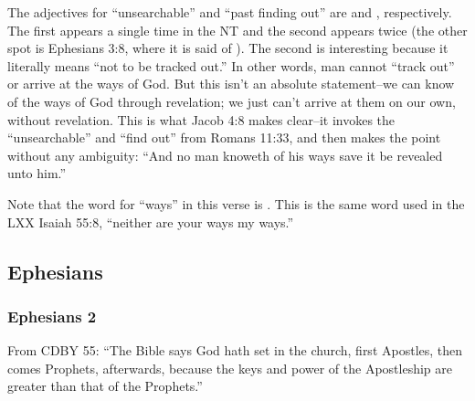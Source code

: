 		\begin{compactdesc}

		\item[33$\vert$]
		\begin{compactdesc}
		\item[unsearchable, past finding out] The adjectives for ``unsearchable'' and ``past finding out'' are  and , respectively. The first appears a single time in the NT and the second appears twice (the other spot is Ephesians 3:8, where it is said of ). The second is interesting because it literally means ``not to be tracked out.'' In other words, man cannot ``track out'' or arrive at the ways of God. But this isn't an absolute statement--we can know of the ways of God through revelation; we just can't arrive at them on our own, without revelation. This is what Jacob 4:8 makes clear--it invokes the ``unsearchable'' and ``find out'' from Romans 11:33, and then makes the point without any ambiguity: ``And no man knoweth of his ways save it be revealed unto him.''

		Note that the word for ``ways'' in this verse is . This is the same word used in the LXX Isaiah 55:8, ``neither are your ways my ways.''
		\end{compactdesc}

		\end{compactdesc}
		
\subsection{Ephesians} %

	\subsubsection{Ephesians 2} %
	
		\begin{compactitem}

		\item[20$\vert$]
		\begin{compactdesc}
		\item[apostles and prophets] From CDBY 55: ``The Bible says God hath set in the church, first Apostles, then comes Prophets, afterwards, because the keys and power of the Apostleship are greater than that of the Prophets.''
		\end{compactdesc}

		\end{compactitem}	

